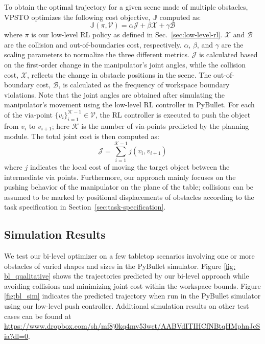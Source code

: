 To obtain the optimal trajectory for a given scene made of multiple obstacles, VPSTO optimizes the following cost objective, $\mathbb{J}$ computed as:
\begin{equation}
    \mathbb{J}(\pi, \mathcal{V}) = \alpha\mathcal{J} + \beta\mathcal{X} + \gamma\mathcal{B} 
\end{equation}
where $\pi$ is our low-level RL policy as defined in Sec.~\ref{sec:low-level-rl}. $\mathcal{X}$ and $\mathcal{B}$ are the collision and out-of-boundaries cost, respectively. $\alpha$, $\beta$, and $\gamma$ are the scaling parameters to normalize the three different metrics.  $\mathcal{J}$ is calculated based on the first-order change in the manipulator's joint angles, while the collision cost, $\mathcal{X}$, reflects the change in obstacle positions in the scene. The out-of-boundary cost, $\mathcal{B}$, is calculated as the frequency of workspace boundary violations. Note that the joint angles are obtained after simulating the manipulator's movement using the low-level RL controller in PyBullet. For each of the via-point $\{v_i\}_{i=1}^{\mathcal{K}-1} \in \mathcal{V}$, the RL controller is executed to push the object from $v_i$ to $v_{i+1}$; here $\mathcal{K}$ is the number of via-points predicted by the planning module. The total joint cost is then computed as:
\begin{equation}
\label{eqn:joint-cost}
    \mathcal{J} = \sum_{i=1}^{\mathcal{K}-1} j(v_i, v_{i+1})
\end{equation}
where $j$ indicates the local cost of moving the target object between the intermediate via points. Furthermore, our approach mainly focuses on the pushing behavior of the manipulator on the plane of the table; collisions can be assumed to be marked by positional displacements of obstacles according to the task specification in Section~\ref{sec:task-specification}.

\subsection{Simulation Results}\label{sec:bl_results}

We test our bi-level optimizer on a few tabletop scenarios involving one or more obstacles of varied shapes and sizes in the PyBullet simulator. Figure \ref{fig: bl_qualitative} shows the trajectories predicted by our bi-level approach while avoiding collisions and minimizing joint cost within the workspace bounds. Figure \ref{fig:bl_sim} indicates the predicted trajectory when run in the PyBullet simulator using our low-level push controller. Additional simulation results on other test cases can be found at \url{https://www.dropbox.com/sh/mf8j0kq4mv53wct/AABVdITIHCfNBtqHMphnJcSia?dl=0}.


